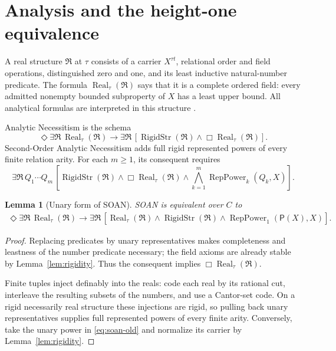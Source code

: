 \documentclass[11pt,letterpaper,numbers=noenddot]{scrartcl}
\numberwithin{equation}{section}
\newtheorem{lemma}[theorem]{Lemma}
\theoremstyle{definition}
\newcommand{\RigidStr}{\operatorname{RigidStr}}
\newcommand{\Rep}{\operatorname{RepPower}_1}
\newcommand{\RepK}{\operatorname{RepPower}}
\newcommand{\Real}{\operatorname{Real}}
\newcommand{\PP}{\mathsf P}
\begin{document}
\section{Analysis and the height-one equivalence}

A real structure $\mathfrak R$ at $\tau$ consists of a carrier $X^{\tau t}$, relational order and field operations, distinguished zero and one, and its least inductive natural-number predicate. The formula $\Real_\tau(\mathfrak R)$ says that it is a complete ordered field: every admitted nonempty bounded subproperty of $X$ has a least upper bound. All analytical formulas are interpreted in this structure \cite{map,bg,bacon}.

Analytic Necessitism is the schema
\begin{equation}\label{eq:ana}
\Diamond\exists\mathfrak R\,\Real_\tau(\mathfrak R)
\to
\exists\mathfrak R\,
 [\RigidStr(\mathfrak R)\land\Box\Real_\tau(\mathfrak R)].
\end{equation}
Second-Order Analytic Necessitism adds full rigid represented powers of every finite relation arity. For each $m\ge1$, its consequent requires
\begin{equation}\label{eq:soan-old}
\exists\mathfrak R\,Q_1\cdots Q_m\,
 \left[\RigidStr(\mathfrak R)\land\Box\Real_\tau(\mathfrak R)
 \land\bigwedge_{k=1}^m\RepK_k(Q_k,X)\right].
\end{equation}

\begin{lemma}[Unary form of SOAN]\label{lem:soan-unary}
SOAN is equivalent over $C$ to
\begin{equation}\label{eq:soan}
\begin{split}
\Diamond\exists\mathfrak R\,\Real_\tau(\mathfrak R)
\to\exists\mathfrak R\,[
\Real_\tau(\mathfrak R)\land\RigidStr(\mathfrak R)
\land\Rep(\PP(X),X)].
\end{split}
\end{equation}
\end{lemma}

\begin{proof}
Replacing predicates by unary representatives makes completeness and leastness of the number predicate necessary; the field axioms are already stable by Lemma~\ref{lem:rigidity}. Thus the consequent implies $\Box\Real_\tau(\mathfrak R)$.

Finite tuples inject definably into the reals: code each real by its rational cut, interleave the resulting subsets of the numbers, and use a Cantor-set code. On a rigid necessarily real structure these injections are rigid, so pulling back unary representatives supplies full represented powers of every finite arity. Conversely, take the unary power in \eqref{eq:soan-old} and normalize its carrier by Lemma~\ref{lem:rigidity}.
\end{proof}
\end{document}

